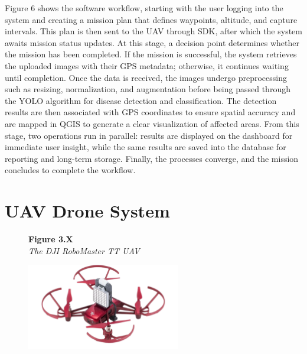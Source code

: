 	Figure 6 shows the software workflow, starting with the user logging into the system and creating a mission plan that defines waypoints, altitude, and capture intervals. This plan is then sent to the UAV through SDK, after which the system awaits mission status updates. At this stage, a decision point determines whether the mission has been completed. If the mission is successful, the system retrieves the uploaded images with their GPS metadata; otherwise, it continues waiting until completion. Once the data is received, the images undergo preprocessing such as resizing, normalization, and augmentation before being passed through the YOLO algorithm for disease detection and classification. The detection results are then associated with GPS coordinates to ensure spatial accuracy and are mapped in QGIS to generate a clear visualization of affected areas. From this stage, two operations run in parallel: results are displayed on the dashboard for immediate user insight, while the same results are saved into the database for reporting and long-term storage. Finally, the processes converge, and the mission concludes to complete the workflow.
	
	\section{UAV Drone System}
	
	\begin{figure}[H]
		\raggedright
		\textbf{Figure 3.X} \\ %
		\textit{The DJI RoboMaster TT UAV} %
		
		\vspace{0.5em}
		\centering
		\includegraphics[width=0.6\textwidth]{figures/Robomaster_TT.pdf} %
		
		\vspace{0.5em}
		\raggedright
		
		\label{fig:robomaster_tt}
	\end{figure}
	
